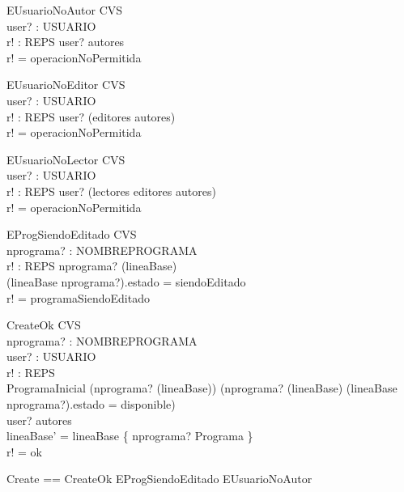 \documentclass[11pt]{article}
\begin{document}
  \begin{schema}{EUsuarioNoAutor}
  \Xi CVS \\
  user? : USUARIO \\
  r! : REPS
  \where
  user? \notin autores \\
  r! = operacionNoPermitida
  \end{schema}
  
  \begin{schema}{EUsuarioNoEditor}
  \Xi CVS \\
  user? : USUARIO \\
  r! : REPS
  \where
  user? \notin (editores \cup autores) \\
  r! = operacionNoPermitida
  \end{schema}
  
  \begin{schema}{EUsuarioNoLector}
  \Xi CVS \\
  user? : USUARIO \\
  r! : REPS
  \where
  user? \notin (lectores \cup editores \cup autores) \\
  r! = operacionNoPermitida
  \end{schema}
  
  \begin{schema}{EProgSiendoEditado}
  \Xi CVS \\
  nprograma? : NOMBREPROGRAMA \\
  r! : REPS
  \where
  nprograma? \in (\dom lineaBase) \\
  (lineaBase \; nprograma?).estado = siendoEditado \\
  r! = programaSiendoEditado
  \end{schema}
  
  \begin{schema}{CreateOk}
  \Delta CVS \\
  nprograma? : NOMBREPROGRAMA \\
  user? : USUARIO \\
  r! : REPS \\
  ProgramaInicial
  \where
  (nprograma? \notin (\dom lineaBase)) \lor (nprograma? \in (\dom lineaBase) \land (lineaBase \; nprograma?).estado = disponible) \\
  user? \in autores \\
  lineaBase' = lineaBase \oplus \{ nprograma? \mapsto \theta Programa \} \\
  r! = ok
  \end{schema}
  
  \begin{zed}
    Create == CreateOk \lor EProgSiendoEditado \lor EUsuarioNoAutor
  \end{zed}
  
\end{document}
